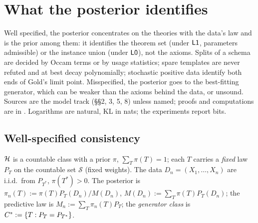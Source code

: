 \providecommand{\identbrk}{\hfil\penalty0\hfilneg}

\section{What the posterior identifies}\label{sec:ident}

Well specified, the posterior concentrates on the theories with the data's law and is the prior among them: it identifies the theorem set (under $\mathord{\mathsf{L1}}$, parameters admissible) or the instance union (under $\mathord{\mathsf{L0}}$), not the axioms. Splits of a schema are decided by Occam terms or by usage statistics; spare templates are never refuted and at best decay polynomially; stochastic positive data identify both ends of Gold's limit point. Misspecified, the posterior goes to the best-fitting generator, which can be weaker than the axioms behind the data, or unsound. Sources are the model track (\S\S2, 3, 5, 8) unless named; proofs and computations are in . Logarithms are natural, KL in nats; the experiments report bits.

\subsection{Well-specified consistency}\label{sec:ident:wellspec}

\begin{definition}[Setting W]\identbrk{}\label{def:ident:W}
$\mathcal{H}$ is a countable class with a prior $\pi$, $\sum_T\pi(T)=1$; each $T$ carries a \emph{fixed} law $P_T$ on the countable set $\mathcal S$ (fixed weights). The data $D_n=(X_1,\dots,X_n)$ are i.i.d.\ from $P_{T^*}$, $\pi(T^*)>0$. The posterior is $\pi_n(T):=\pi(T)P_T(D_n)/M(D_n)$, $M(D_n):=\sum_T\pi(T)P_T(D_n)$; the predictive law is $M_n:=\sum_T\pi_n(T)P_T$; the \emph{generator class} is $C^{*}:=\{T:P_T=P_{T^*}\}$.
\end{definition}

